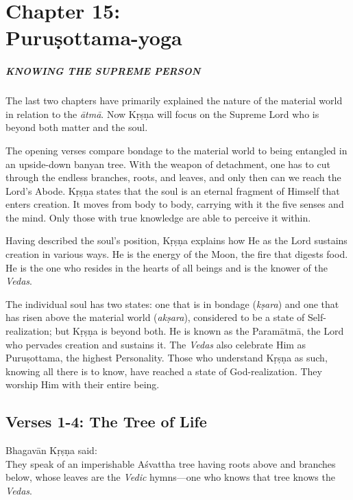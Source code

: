 \chapter{Chapter 15: \\Puruṣottama-yoga}\label{chap-purusottama-yoga}

\paragraph*{\MakeUppercase{Knowing the Supreme Person}}

\noindent The last two chapters have primarily explained the nature of the material world in relation to the \textit{ātmā}. Now Kṛṣṇa will focus on the Supreme Lord who is beyond both matter and the soul.

The opening verses compare bondage to the material world to being entangled in an upside-down banyan tree. With the weapon of detachment, one has to cut through the endless branches, roots, and leaves, and only then can we reach the Lord’s Abode. Kṛṣṇa states that the soul is an eternal fragment of Himself that enters creation. It moves from body to body, carrying with it the five senses and the mind. Only those with true knowledge are able to perceive it within.

Having described the soul’s position, Kṛṣṇa explains how He as the Lord sustains creation in various ways. He is the energy of the Moon, the fire that digests food. He is the one who resides in the hearts of all beings and is the knower of the \textit{Vedas}.

The individual soul has two states: one that is in bondage (\textit{kṣara}) and one that has risen above the material world (\textit{akṣara}), considered to be a state of Self-realization; but Kṛṣṇa is beyond both. He is known as the Paramātmā, the Lord who pervades creation and sustains it. The \textit{Vedas} also celebrate Him as Puruṣottama, the highest Personality. Those who understand Kṛṣṇa as such, knowing all there is to know, have reached a state of God-realization. They worship Him with their entire being.

\section{Verses 1-4: The Tree of Life}\label{sec-verses-1-4-the-tree-of-life}

{\hspace*{1em}Bhagavān Kṛṣṇa said: \\
They speak of an imperishable Aśvattha tree having roots above and branches below, whose leaves are the \textit{Vedic} hymns---one who knows that tree knows the \textit{Vedas}.}

